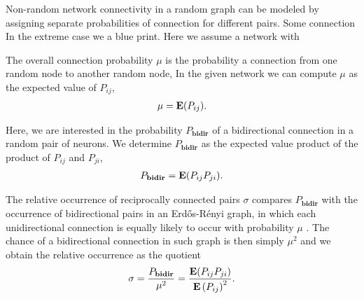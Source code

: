 






Non-random network connectivity in a random graph can be modeled by assigning separate probabilities of connection for different pairs. Some connection  In the extreme case we a blue print. Here we assume a network with 

The overall connection probability $\mu$ is the probability a connection from one random node to another random node, In the given network we can compute $\mu$ as the expected value of $P_{ij}$,
\begin{align}
\mu = \operatorname{\mathbf{E}}(P_{ij}).
\end{align}



Here, we are interested in the probability $P_{\mathbf{bidir}}$ of a bidirectional connection in a random pair of neurons. We determine $P_{\mathbf{bidir}}$ as the expected value product of the product of $P_{ij}$ and $P_{ji}$,
%
\begin{align}
P_{\mathbf{bidir}} = \operatorname{\mathbf{E}}(P_{ij} P_{ji}).
\end{align}
%

The relative occurrence of reciprocally connected pairs $\sigma$ compares $P_{\mathbf{bidir}}$ with the occurrence of bidirectional pairs in an Erd\H{o}s-R\'{e}nyi graph, in which each unidirectional connection is equally likely to occur with probability $\mu$ \cite{Gilbert1959, Erdos1959}. The chance of a bidirectional connection in such graph is then simply $\mu^2$ and we obtain the relative occurrence as the quotient
\begin{align}
\sigma = \frac{P_{\mathbf{bidir}}}{\mu^2} = \frac{\operatorname{\mathbf{E}}(P_{ij}P_{ji})}{{\operatorname{\mathbf{E}}\left(P_{ij}\right)}^2}.
\end{align}


